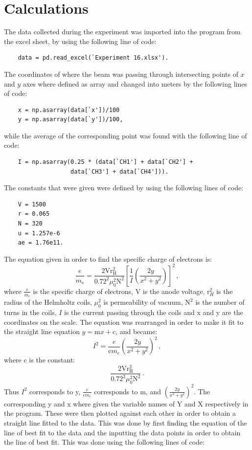 \documentclass[12pt, a4paper]{article}
\begin{document}
\section*{Calculations}
The data collected during the experiment was imported into the program from the excel sheet, by using the following line of code:
\begin{lstlisting}
    data = pd.read_excel(`Experiment 16.xlsx').
\end{lstlisting}
The coordinates of where the beam was passing through intersecting points of $x$ and $y$ axes where defined as array and changed into meters by the following lines of code:
\begin{lstlisting}
    x = np.asarray(data[`x'])/100
    y = np.asarray(data[`y'])/100,
\end{lstlisting}
while the average of the corresponding point was found with the following line of code:
\begin{lstlisting}
    I = np.asarray(0.25 * (data[`CH1'] + data[`CH2'] + 
                   data[`CH3'] + data[`CH4'])).
\end{lstlisting}
The constants that were given were defined by using the following lines of code:
\begin{lstlisting}
    V = 1500
    r = 0.065
    N = 320
    u = 1.257e-6
    ae = 1.76e11.
\end{lstlisting}
The equation given in order to find the specific charge of electrons is:
\begin{equation*}
    \frac{e}{m_{\text{e}}} = \frac{2\text{V}\text{r}_{\text{H}}^2}{0.72^2\mu_0^2\text{N}^2}\left[\frac{1}{I}\left(\frac{2y}{x^2 + y^2}\right)\right]^2\,,
\end{equation*}
where $\frac{e}{m_e}$ is the specific charge of electrons, V is the anode voltage, $\text{r}_H^2$ is the radius of the Helmholtz coils, $\mu_0^2$ is permeability of vacuum, $\text{N}^2$ is the number of turns in the coils, $I$ is the current passing through the coils and x and y are the coordinates on the scale. The equation was rearranged in order to make it fit to the straight line equation $y=\text{m}x+\text{c}$, and became:
\begin{equation*}
    I^2 = \frac{e}{\text{c}m_e}\left(\frac{2y}{x^2 + y^2}\right)^2 \,,
\end{equation*}
where c is the constant:
\begin{equation*}
    \frac{2\text{V}\text{r}_{\text{H}}^2}{0.72^2\mu_0^2\text{N}^2}\,.
\end{equation*}
Thus $I^2$ corresponds to y, $\frac{e}{\text{c}m_e}$ corresponds to m, and $\left(\frac{2y}{x^2 + y^2}\right)^2$. The corresponding y and x where given the variable names of Y and X respectively in the program. These were then plotted against each other in order to obtain a straight line fitted to the data. This was done by first finding the equation of the line of best fit to the data and the inputting the data points in order to obtain the line of best fit. This was done using the following lines of code:
\end{document}
